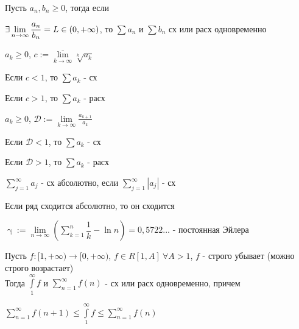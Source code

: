 \documentclass[main]{subfiles}
\begin{document}
    \begin{consequence} 
        Пусть $a_n, b_n \geqslant 0$, тогда если

        $\exists \lim\limits_{n \rightarrow \infty} \dfrac{a_n}{b_n} = L \in (0, + \infty)$, то $\sum a_n$ и $\sum b_n$ сх или расх одновременно
    \end{consequence}

    \begin{theorem} 
        $a_k \geqslant 0$, $c:=\overline{\lim\limits_{k \rightarrow \infty}} \sqrt[k]{a_k}$

        Если $c < 1$, то $\sum a_k$ - сх

        Если $c > 1$, то $\sum a_k$ - расх
    \end{theorem}

    \begin{theorem} 
        $a_k \geqslant 0$, $\mathcal{D}:=\lim\limits_{k \rightarrow \infty} \frac{a_{k+1}}{a_k}$

        Если $\mathcal{D} < 1$, то $\sum a_k$ - сх

        Если $\mathcal{D} > 1$, то $\sum a_k$ - расх
    \end{theorem}

    \begin{definition}
        $\sum\limits_{j=1}^\infty a_j$ - сх абсолютно, если $\sum\limits_{j=1}^\infty |a_j|$ - сх
    \end{definition}

    \begin{theorem}
        Если ряд сходится абсолютно, то он сходится
    \end{theorem}

    \begin{definition}
        $\upgamma := \lim\limits_{n \rightarrow \infty} (\sum\limits_{k=1}^n \dfrac{1}{k} - \ln n) = 0,5722...$ - постоянная Эйлера
    \end{definition}

    \begin{theorem}
        Пусть $f: [1, +\infty) \rightarrow [0, +\infty)$, $f \in R[1,A]\ \forall A > 1$, $f$ - строго убывает (можно строго возрастает)
        \\
        Тогда $\int\limits_1^\infty f$ и $\sum\limits_{n=1}^\infty f(n)$ - сх или расх одновременно, причем

        $\sum\limits_{n=1}^\infty f(n+1) \leqslant \int\limits_1^\infty f \leqslant \sum\limits_{n=1}^{\infty} f(n)$
    \end{theorem}
\end{document}
